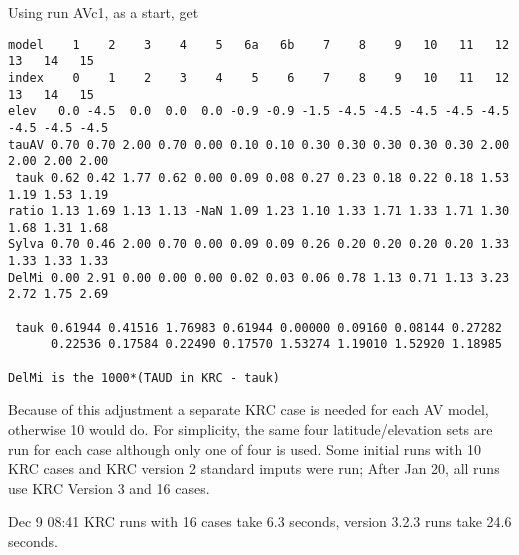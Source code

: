 \documentclass{article}
\begin{document}
Using run AVc1, as a start, get
\vspace{-3.mm} 
\begin{verbatim}
model    1    2    3    4    5   6a   6b    7    8    9   10   11   12   13   14   15
index    0    1    2    3    4    5    6    7    8    9   10   11   12   13   14   15
elev   0.0 -4.5  0.0  0.0  0.0 -0.9 -0.9 -1.5 -4.5 -4.5 -4.5 -4.5 -4.5 -4.5 -4.5 -4.5
tauAV 0.70 0.70 2.00 0.70 0.00 0.10 0.10 0.30 0.30 0.30 0.30 0.30 2.00 2.00 2.00 2.00
 tauk 0.62 0.42 1.77 0.62 0.00 0.09 0.08 0.27 0.23 0.18 0.22 0.18 1.53 1.19 1.53 1.19
ratio 1.13 1.69 1.13 1.13 -NaN 1.09 1.23 1.10 1.33 1.71 1.33 1.71 1.30 1.68 1.31 1.68
Sylva 0.70 0.46 2.00 0.70 0.00 0.09 0.09 0.26 0.20 0.20 0.20 0.20 1.33 1.33 1.33 1.33
DelMi 0.00 2.91 0.00 0.00 0.00 0.02 0.03 0.06 0.78 1.13 0.71 1.13 3.23 2.72 1.75 2.69

 tauk 0.61944 0.41516 1.76983 0.61944 0.00000 0.09160 0.08144 0.27282
      0.22536 0.17584 0.22490 0.17570 1.53274 1.19010 1.52920 1.18985

DelMi is the 1000*(TAUD in KRC - tauk)
\end{verbatim} 


Because of this adjustment a separate KRC case is needed for each AV model, otherwise 10 would do. For simplicity, the same four latitude/elevation sets are run for each case although only one of four is used.  Some initial runs with 10 KRC cases and KRC version 2 standard imputs were run; After Jan 20, all runs use KRC Version 3 and 16 cases. 

 Dec  9 08:41 KRC runs with 16 cases take 6.3 seconds, version 3.2.3 runs take   24.6 seconds.
\end{document}
